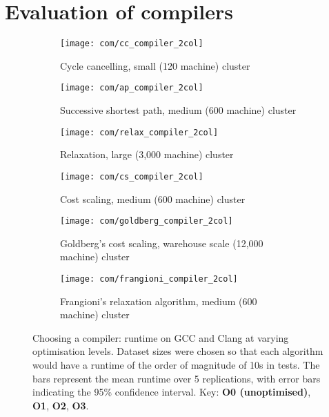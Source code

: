
\section{Evaluation of compilers} \label{appendix:test-compilers}

\begin{figure}
    \begin{widepage}
    \begin{subfigure}[c]{0.5\textwidth}
        \texttt{[image: com/cc\_compiler\_2col]}
        \caption{Cycle cancelling, small (120 machine) cluster}
        \label{fig:compilers:cc}
    \end{subfigure}
    \begin{subfigure}[c]{0.5\textwidth}
        \texttt{[image: com/ap\_compiler\_2col]}
        \caption{Successive shortest path, medium (600 machine) cluster}
        \label{fig:compilers:ap}
    \end{subfigure}
    \begin{subfigure}[c]{0.5\textwidth}
        \texttt{[image: com/relax\_compiler\_2col]}
        \caption{Relaxation, large (3,000 machine) cluster}
        \label{fig:compilers:relax}
    \end{subfigure}
    \begin{subfigure}[c]{0.5\textwidth}
        \texttt{[image: com/cs\_compiler\_2col]}
        \caption{Cost scaling, medium (600 machine) cluster}
        \label{fig:compilers:cs}
    \end{subfigure}
    \begin{subfigure}[c]{0.5\textwidth}
        \texttt{[image: com/goldberg\_compiler\_2col]}
        \caption{Goldberg's cost scaling, warehouse scale (12,000 machine) cluster}
        \label{fig:compilers:goldberg}
    \end{subfigure}
    \begin{subfigure}[c]{0.5\textwidth}
        \texttt{[image: com/frangioni\_compiler\_2col]}
        \caption{Frangioni's relaxation algorithm, medium (600 machine) cluster}
        \label{fig:compilers:frangioni}
    \end{subfigure}
    \end{widepage}
    \caption[Choosing a compiler]{Choosing a compiler: runtime on GCC and Clang at varying optimisation levels. Dataset sizes were chosen so that each algorithm would have a runtime of the order of magnitude of 10s in tests. The bars represent the mean runtime over 5 replications, with error bars indicating the 95\% confidence interval. Key:  \textbf{\color{matplotlib_bar_r} O0 (unoptimised)}, \textbf{\color{matplotlib_bar_g} O1}, \textbf{\color{matplotlib_bar_b} O2}, \textbf{\color{matplotlib_bar_k} O3}.}
    \label{fig:compilers}
\end{figure}

